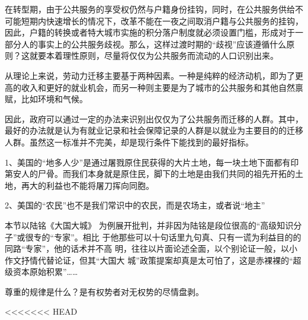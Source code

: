 
在转型期，由于公共服务的享受权仍然与户籍身份挂钩，同时，在公共服务供给不可能短期内快速增长的情况下，改革不能在一夜之间取消户籍与公共服务的挂钩，因此，户籍的转换或者特大城市实施的积分落户制度就必须设置门槛，形成对于一部分人的事实上的公共服务歧视。那么，这样过渡时期的“歧视”应该遵循什么原则？这就要本着理性原则，尽量将仅仅为公共服务而流动的人口识别出来。

从理论上来说，劳动力迁移主要基于两种因素。一种是纯粹的经济动机，即为了更高的收入和更好的就业机会，而另一种则主要是为了城市的公共服务和其他自然禀赋，比如环境和气候。

因此，政府可以通过一定的办法来识别出仅仅为了公共服务而迁移的人群。其中，最好的办法就是认为有就业记录和社会保障记录的人群是以就业为主要目的的迁移人群。虽然这一标准并不完美，却是现行条件下能找到的最好指标。










1、美国的“地多人少”是通过屠戮原住民获得的大片土地，每一块土地下面都有印第安人的尸骨。而我们本身就是原住民，脚下的土地是由我们共同的祖先开拓的土地，再大的利益也不能将屠刀挥向同胞。

2、美国的“农民”也不是我们常识中的农民，而是农场主，或者说“地主”

本节以陆铭《大国大城》
为例展开批判，并非因为陆铭是段位很高的“高级知识分子”或很专的“专家”。相比
于他那些可以十句话里九句真、只有一谎为利益目的的同路“专家”，他的话术并不高
明，往往以片面论述全面，以个别论证一般，以小作文抒情代替论证，但其“大国大
城”政策提案却真是太可怕了，这是赤裸裸的“超级资本原始积累”……


尊重的规律是什么？是有权势者对无权势的尽情盘剥。

<<<<<<< HEAD

